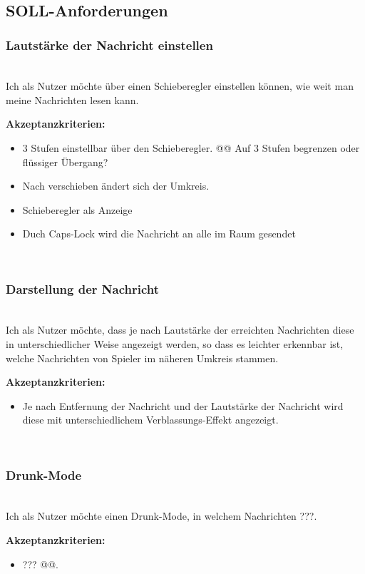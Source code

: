 \documentclass[conference]{IEEEtran}
\begin{document}
	\ \\
	\subsection{SOLL-Anforderungen}
	\subsubsection{Lautstärke der Nachricht einstellen}
	\ \\
	Ich als Nutzer möchte über einen Schieberegler einstellen können, wie weit man meine Nachrichten lesen kann.
	
	\textbf{Akzeptanzkriterien:}
	\begin{itemize}
		\item 3 Stufen einstellbar über den Schieberegler.  @@ Auf 3 Stufen begrenzen oder flüssiger Übergang?
		\item Nach verschieben ändert sich der Umkreis.
		\item Schieberegler als Anzeige
		\item Duch Caps-Lock wird die Nachricht an alle im Raum gesendet
	\end{itemize}
	\ \\
	
	\subsubsection{Darstellung der Nachricht}
	\ \\
	Ich als Nutzer möchte, dass je nach Lautstärke der erreichten Nachrichten diese in unterschiedlicher Weise angezeigt werden, so dass es leichter erkennbar ist, welche Nachrichten von Spieler im näheren Umkreis stammen.
	
	\textbf{Akzeptanzkriterien:}
	\begin{itemize}
		\item Je nach Entfernung der Nachricht und der Lautstärke der Nachricht wird diese mit unterschiedlichem Verblassungs-Effekt angezeigt.
	\end{itemize}
	\ \\

	\subsubsection{Drunk-Mode}
	\ \\
	Ich als Nutzer möchte einen Drunk-Mode, in welchem Nachrichten ???.
	
	\textbf{Akzeptanzkriterien:}
	\begin{itemize}
		\item ??? @@.
	\end{itemize}
\end{document}
